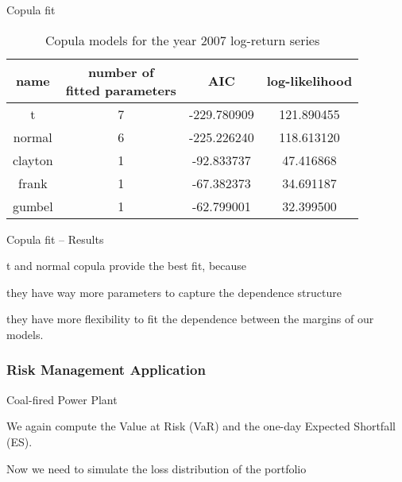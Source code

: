 


{Copula fit}

\begin{table}[ht]
            \vspace{0.5cm}
            \begin{center}
                \begin{tabular}{c|c|c|c}
                    name&\parbox{3cm}{\centering number of\\ fitted parameters}&AIC&log-likelihood\\\hline
                    t&7&-229.780909&121.890455\\
                    normal&6&-225.226240&118.613120\\
                    clayton&1&-92.833737&47.416868\\
                    frank&1&-67.382373&34.691187\\
                    gumbel&1&-62.799001&32.399500\\
                \end{tabular}
                \caption{Copula models for the year 2007 log-return series}
            \end{center}
        \end{table}

{Copula fit -- Results}

t and normal copula provide the best fit,  because






	they have way more parameters to capture the dependence
structure

	they have more flexibility to fit the dependence
between the margins of our models.






\subsubsection{Risk Management Application}

{Coal-fired Power Plant}

We again compute the Value at Risk (VaR) and the one-day Expected
Shortfall (ES).

Now we need to simulate the loss distribution of the portfolio



